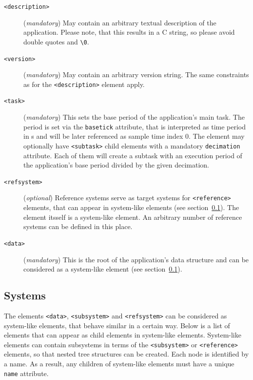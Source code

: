 \begin{description}

\item[\small\texttt{<description>}] (\textit{mandatory}) May contain an
arbitrary textual description of the application. Please note, that this
results in a C string, so please avoid double quotes and \lstinline+\0+.

\item[\small\texttt{<version>}] (\textit{mandatory}) May contain an arbitrary
version string. The same constraints as for the \texttt{<description>}
element apply.

\item[\small\texttt{<task>}] (\textit{mandatory}) This sets the base period of
the application's main task. The period is set via the \texttt{basetick}
attribute, that is interpreted as time period in \textmu s and will be later
referenced as sample time index 0. The element may optionally have
\texttt{<subtask>} child elements with a mandatory \texttt{decimation}
attribute. Each of them will create a subtask with an execution period of the
application's base period divided by the given decimation.

\item[\small\texttt{<refsystem>}] (\textit{optional}) Reference systems serve
as target systems for \texttt{<reference>} elements, that can appear in
system-like elements (see section~\ref{sec:xml-system}). The element itsself
is a system-like element. An arbitrary number of reference systems can be
defined in this place.

\item[\small\texttt{<data>}] (\textit{mandatory}) This is the root of the
application's data structure and can be considered as a system-like element
(see section~\ref{sec:xml-system}).

\end{description}


\subsection{Systems}
\label{sec:xml-system}

The elements \texttt{<data>}, \texttt{<subsystem>} and \texttt{<refsystem>}
can be considered as system-like elements, that behave similar in a certain
way.  Below is a list of elements that can appear as child elements in
system-like elements. System-like elements can contain subsystems in terms of
the \texttt{<subsystem>} or \texttt{<reference>} elements, so that nested tree
structures can be created. Each node is identified by a name. As a result, any
children of system-like elements must have a unique \texttt{name} attribute.

